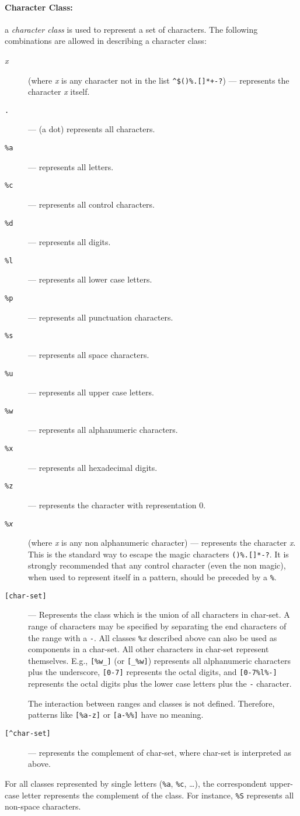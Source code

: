 \documentclass[11pt]{article}
\newcommand{\M}[1]{\emph{#1}}
\newcommand{\T}[1]{{\tt #1}}
\newcommand{\Def}[1]{\emph{#1}\index{#1}}
\begin{document}
\paragraph{Character Class:}
a \Def{character class} is used to represent a set of characters.
The following combinations are allowed in describing a character class:
\begin{description}
\item[\emph{x}] (where \emph{x} is any character not in the list
\verb|^$()%.[]*+-?|)
--- represents the character \emph{x} itself.
\item[\T{.}] --- (a dot) represents all characters.
\item[\T{\%a}] --- represents all letters.
\item[\T{\%c}] --- represents all control characters.
\item[\T{\%d}] --- represents all digits.
\item[\T{\%l}] --- represents all lower case letters.
\item[\T{\%p}] --- represents all punctuation characters.
\item[\T{\%s}] --- represents all space characters.
\item[\T{\%u}] --- represents all upper case letters.
\item[\T{\%w}] --- represents all alphanumeric characters.
\item[\T{\%x}] --- represents all hexadecimal digits.
\item[\T{\%z}] --- represents the character with representation 0.
\item[\T{\%\M{x}}] (where \M{x} is any non alphanumeric character)  ---
represents the character \M{x}.
This is the standard way to escape the magic characters \verb|()%.[]*-?|.
It is strongly recommended that any control character (even the non magic),
when used to represent itself in a pattern, should be preceded by a \verb|%|.

\item[\T{[char-set]}] ---
Represents the class which is the union of all
characters in char-set.
A range of characters may be specified by
separating the end characters of the range with a \verb|-|.
All classes \verb|%|\emph{x} described above can also be used as
components in a char-set.
All other characters in char-set represent themselves.
E.g., \verb|[%w_]| (or \verb|[_%w]|)
represents all alphanumeric characters plus the underscore,
\verb|[0-7]| represents the octal digits,
and \verb|[0-7%l%-]| represents the octal digits plus
the lower case letters plus the \verb|-| character.

The interaction between ranges and classes is not defined.
Therefore, patterns like \verb|[%a-z]| or \verb|[a-%%]|
have no meaning.

\item[\T{[\^{ }char-set]}] ---
represents the complement of char-set,
where char-set is interpreted as above.
\end{description}
For all classes represented by single letters (\verb|%a|, \verb|%c|, \ldots),
the correspondent upper-case letter represents the complement of the class.
For instance, \verb|%S| represents all non-space characters.
\end{document}
